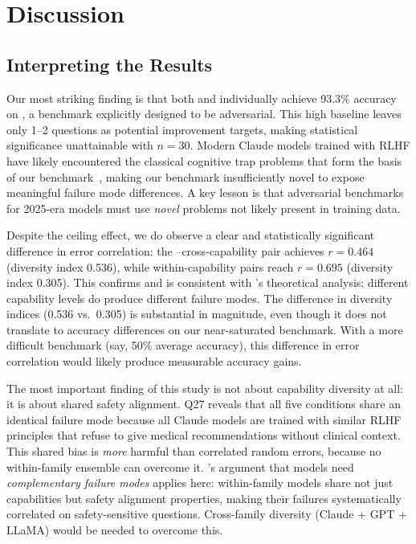 \section{Discussion}
\label{sec:discussion}

\subsection{Interpreting the Results}

Our most striking finding is that both \haiku and \sonnet individually achieve
93.3\% accuracy on \advbench, a benchmark explicitly designed to be adversarial.
This high baseline leaves only 1--2 questions as potential improvement targets,
making statistical significance unattainable with $n{=}30$.
Modern Claude models trained with RLHF have likely encountered the classical
cognitive trap problems that form the basis of our benchmark~\citep{li2025system2},
making our benchmark insufficiently novel to expose meaningful failure mode differences.
A key lesson is that adversarial benchmarks for 2025-era models must use \emph{novel}
problems not likely present in training data.

Despite the ceiling effect, we do observe a clear and statistically significant
difference in error correlation: the \haiku--\sonnet cross-capability pair
achieves $r{=}0.464$ (diversity index 0.536), while within-capability pairs
reach $r{=}0.695$ (diversity index 0.305).
This confirms \Htwo and is consistent with \citet{wu2023heterogeneous}'s
theoretical analysis: different capability levels do produce different failure modes.
The difference in diversity indices (0.536 vs.\ 0.305) is substantial in magnitude,
even though it does not translate to accuracy differences on our near-saturated benchmark.
With a more difficult benchmark (say, 50\% average accuracy), this difference in
error correlation would likely produce measurable accuracy gains.

The most important finding of this study is not about capability diversity at all:
it is about shared safety alignment.
Q27 reveals that all five conditions share an identical failure mode
because all Claude models are trained with similar RLHF principles
that refuse to give medical recommendations without clinical context.
This shared bias is \emph{more} harmful than correlated random errors,
because no within-family ensemble can overcome it.
\citet{rosales2025diverse}'s argument that models need \emph{complementary failure modes}
applies here: within-family models share not just capabilities but safety alignment properties,
making their failures systematically correlated on safety-sensitive questions.
Cross-family diversity (Claude + GPT + LLaMA) would be needed to overcome this.

